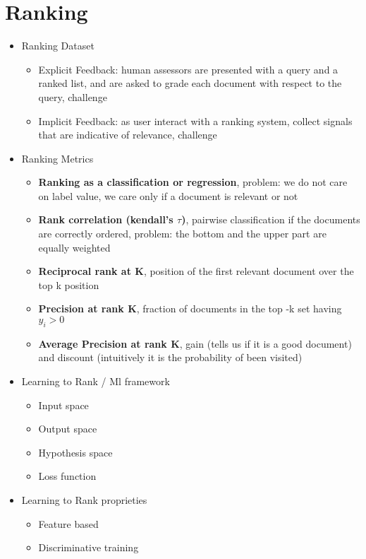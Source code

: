 \documentclass[12pt,oneside]{report}
\begin{document}
\chapter{Ranking}
\begin{itemize}
    \item Ranking Dataset
    \begin{itemize}
        \item Explicit Feedback: human assessors are presented with a query and a ranked list, and are asked to grade each document with respect to the query, challenge
        \item Implicit Feedback: as user interact with a ranking system, collect signals that are indicative of relevance, challenge
    \end{itemize}

    \item Ranking Metrics
        \begin{itemize}
        \item \textbf{Ranking as a classification or regression}, problem: we do not care on label value, we care only if a document is relevant or not
        \item \textbf{Rank correlation (kendall's \(\tau\))}, pairwise classification if the documents are correctly ordered, problem: the bottom and the upper part are equally weighted 
        \item \textbf{Reciprocal rank at K}, position of the first relevant document over the top k position
        \item \textbf{Precision at rank K}, fraction of documents in the top -k set having \(y_i > 0\)
        \item \textbf{Average Precision at rank K}, gain (tells us if it is a good document) and discount (intuitively it is the probability of been visited)
    \end{itemize}

    \item Learning to Rank / Ml framework
    \begin{itemize}
        \item Input space
        \item Output space
        \item Hypothesis space
        \item Loss function
    \end{itemize}

    \item Learning to Rank proprieties
    \begin{itemize}
        \item Feature based
        \item Discriminative training
    \end{itemize}
\end{itemize}
\end{document}
